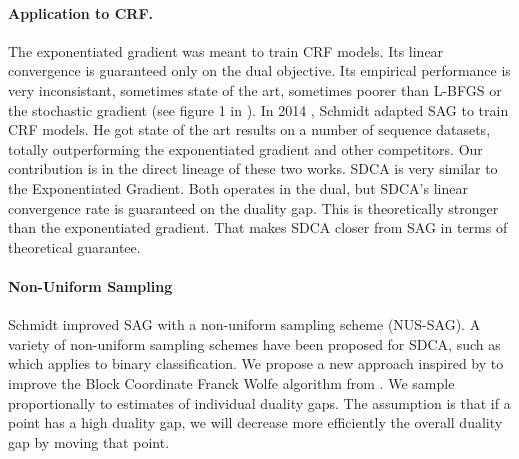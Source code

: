 \documentclass{article}
\DeclareMathOperator{\1}{\mathbb{1}}
\begin{document}
\paragraph{Application to CRF.}
The exponentiated gradient was meant to train CRF models.
Its linear convergence is guaranteed only on the dual objective.
Its empirical performance is very inconsistant, sometimes state of the art, sometimes poorer than L-BFGS or the stochastic gradient (see figure 1 in \cite{schmidt_non-uniform_2015}). 
In 2014 \cite{schmidt_non-uniform_2015}, Schmidt adapted SAG to train CRF models.
He got state of the art results on a number of sequence datasets, totally outperforming the exponentiated gradient and other competitors.
Our contribution is in the direct lineage of these two works.
SDCA is very similar to the Exponentiated Gradient.
Both operates in the dual, but SDCA's linear convergence rate is  guaranteed on the duality gap.
This is theoretically stronger than the exponentiated gradient.
That makes SDCA closer from SAG in terms of theoretical guarantee.

\paragraph{Non-Uniform Sampling}
Schmidt improved SAG with a non-uniform sampling scheme (NUS-SAG).
A variety of non-uniform sampling schemes have been proposed for SDCA, such as \cite{csiba_stochastic_2015} which applies to binary classification.
We propose a new approach inspired by \cite{osokin_minding_2016} to improve the Block Coordinate Franck Wolfe algorithm from \cite{lacoste-julien_block-coordinate_2012}.
We sample proportionally to estimates of individual duality gaps.
The assumption is that if a point has a high duality gap, we will decrease more efficiently  the overall duality gap by moving that point. 
\end{document}
